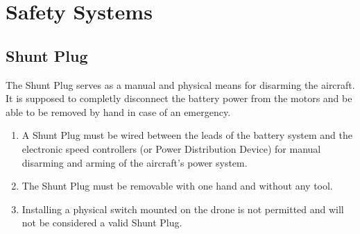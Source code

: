 \documentclass{article}
\begin{document}
\section{Safety Systems}

\subsection{Shunt Plug}
The Shunt Plug serves as a manual and physical means for disarming the aircraft. It is supposed to completly disconnect the battery power from the motors and be able to be removed by hand in case of an emergency.
\begin{enumerate}
  \item A Shunt Plug must be wired between the leads of the battery system and the electronic speed controllers (or Power Distribution Device) for manual disarming and arming of the aircraft's power system.
  \item The Shunt Plug must be removable with one hand and without any tool.
  \item Installing a physical switch mounted on the drone is not permitted and will not be considered a valid Shunt Plug.
  \end{enumerate}
  
  
  
\end{document}
